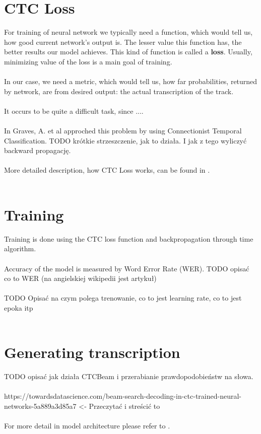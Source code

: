 \documentclass[licencjacka,en]{pracamgr}
\begin{document}
\section{CTC Loss}
For training of neural network we typically need a function, which would tell us, how good current network's output is. The lesser value this function has, the better results our model achieves. This kind of function is called a \textbf{loss}. Usually, minimizing value of the loss is a main goal of training. \\\\
In our case, we need a metric, which would tell us, how far probabilities, returned by network, are from desired output: the actual transcription of the track.\\\\
It occurs to be quite a difficult task, since ....\\\\
In \cite{DS3} Graves, A. et al approched this problem by using Connectionist Temporal Classification.
TODO krótkie strzeszczenie, jak to działa. I jak z tego wyliczyć backward propagację. \\\\
More detailed description, how CTC Loss works, can be found in \cite{DS3}.\\\\

\section{Training}
Training is done using the CTC loss function and backpropagation through time algorithm. \\\\
Accuracy of the model is measured by Word Error Rate (WER). TODO opisać co to WER (na angielskiej wikipedii jest artykuł)\\\\
TODO Opisać na czym polega trenowanie, co to jest learning rate, co to jest epoka itp \\\\

\section{Generating transcription}
TODO opisać jak działa CTCBeam i przerabianie prawdopodobieństw na słowa. \\\\
https://towardsdatascience.com/beam-search-decoding-in-ctc-trained-neural-networks-5a889a3d85a7 <- Przeczytać i streścić to\\\\
For more detail in model architecture please refer to \cite{DS2}.
\end{document}
